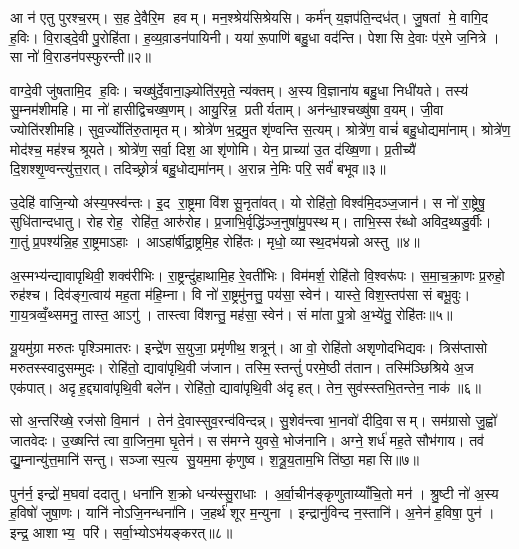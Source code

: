 आ न॑ एतु पुरश्च॒रम्। स॒ह दे॒वैरि॒म हवम्। मन॒श्श्रेय॑सिश्रेयसि। कर्म॑न् य॒ज्ञप॑ति॒न्दध॑त्। जु॒षतां मे॒ वागि॒द ह॒विः। वि॒राड्दे॒वी पु॒रोहि॑ता। ह॒व्य॒वा़डन॑पायिनी। यया॑ रू॒पाणि॑ बहु॒धा वद॑न्ति। पेशासि दे॒वाः प॑र॒मे ज॒नित्रे। सा नो॑ वि॒राडन॑पस्फुरन्ती॥२॥

वाग्दे॒वी जु॑षतामि॒द ह॒विः। चख्षु॑र्दे॒वाना॒ञ्ज्योति॑र॒मृते॒ न्य॑क्तम्। अ॒स्य वि॒ज्ञाना॑य बहु॒धा निधी॑यते। तस्य॑ सु॒म्नम॑शीमहि। मा नो॑ हासीद्विचख्ष॒णम्। आयु॒रिन्न॒ प्रतीर्यताम्। अन॑न्धा॒श्चख्षु॑षा व॒यम्। जी॒वा ज्योति॑रशीमहि। सुव॒र्ज्योति॑रु॒तामृतम्। श्रोत्रे॑ण भ॒द्रमु॒त शृ॑ण्वन्ति स॒त्यम्। श्रोत्रे॑ण॒ वाचं॑ बहु॒धोद्यमा॑नाम्। श्रोत्रे॑ण॒ मोद॑श्च॒ मह॑श्च श्रूयते। श्रोत्रे॑ण॒ सर्वा॒ दिश॒ आ शृ॑णोमि। येन॒ प्राच्या॑ उ॒त द॑ख्षि॒णा। प्र॒तीच्यै॑ दि॒शश्शृ॒ण्वन्त्यु॑त्त॒रात्। तदिच्छ्रोत्रं॑ बहु॒धोद्यमा॑नम्। अ॒रान्न ने॒मिः परि॒ सर्वं॑ बभूव॥३॥\anuvakamend[अ॒ग्रि॒यमन॑पस्फुरन्ती स॒त्य स॒प्त च॑]

उ॒देहि॑ वाजि॒न्यो अ॑स्य॒फ्स्व॑न्तः। इ॒द रा॒ष्ट्रमा वि॑श सू॒नृता॑वत्। यो रोहि॑तो॒ विश्व॑मि॒दञ्ज॒जान॑। स नो॑ रा॒ष्ट्रेषु॒ सुधि॑तान्दधातु। रोहरोह॒ रोहि॑त॒ आरु॑रोह। प्र॒जाभि॒र्वृद्धि॑ञ्ज॒नुषा॑मु॒पस्थम्। ताभि॒स्सर॑ब्धो अविद॒थ्षडु॒र्वीः। गा॒तुं प्र॒पश्य॑न्नि॒ह रा॒ष्ट्रमाऽहाः। आऽहा॑र्\mbox{}षीद्रा॒ष्ट्रमि॒ह रोहि॑तः। मृधो॒ व्यास्थ॒दभ॑यन्नो अस्तु ॥४॥

अ॒स्मभ्य॑न्द्यावापृथिवी॒ शक्व॑रीभिः। रा॒ष्ट्रन्दु॑हाथामि॒ह रे॒वती॑भिः। विम॑मर्\mbox{}श॒ रोहि॑तो वि॒श्वरू॑पः। स॒मा॒च॒क्रा॒णः प्र॒रुहो॒ रुह॑श्च। दिव॑ङ्ग॒त्वाय॑ मह॒ता म॑हि॒म्ना। वि नो॑ रा॒ष्ट्रमु॑नत्तु॒ पय॑सा॒ स्वेन॑। यास्ते॒ विश॒स्तप॑सा सं बभू॒वुः। गा॒य॒त्रव्वँ॒थ्समनु॒ तास्त॒ आऽगु॑। तास्त्वा वि॑शन्तु॒ मह॑सा॒ स्वेन॑। सं मा॑ता पु॒त्रो अ॒भ्ये॑तु॒ रोहि॑तः॥५॥

यू॒यमु॑ग्रा मरुतः पृश्ञिमातरः। इन्द्रे॑ण स॒युजा॒ प्रमृ॑णीथ॒ शत्रून्॑। आ वो॒ रोहि॑तो अशृणोदभिद्यवः। त्रिस॑प्तासो मरुतस्स्वादुसम्मुदः। रोहि॑तो॒ द्यावा॑पृथि॒वी ज॑जान। तस्मि॒स्तन्तुं॑ परमे॒ष्ठी त॑तान। तस्मि॑ञ्छिश्रिये अ॒ज एक॑पात्। अदृह॒द्द्यावा॑पृथि॒वी बले॑न। रोहि॑तो॒ द्यावा॑पृथि॒वी अ॑दृहत्। तेन॒ सुव॑स्स्तभि॒तन्तेन॒ नाक॑॥६॥

सो अ॒न्तरि॑ख्षे॒ रज॑सो वि॒मान॑। तेन॑ दे॒वास्सुव॒रन्व॑विन्दन्न्। सु॒शेव॑न्त्वा भा॒नवो॑ दीदि॒वासम्। सम॑ग्रासो जु॒ह्वो॑ जातवेदः। उ॒ख्षन्ति॑ त्वा वा॒जिन॒मा घृ॒तेन॑। सस॑मग्ने युवसे॒ भोज॑नानि। अग्ने॒ शर्ध॑ मह॒ते सौभ॑गाय। तव॑ द्यु॒म्नान्यु॑त्त॒मानि॑ सन्तु। सञ्जास्प॒त्य सु॒यम॒मा कृ॑णुष्व। श॒त्रू॒य॒ताम॒भि ति॑ष्ठा॒ महासि॥७॥\anuvakamend[अ॒स्त्वे॒तु॒ रोहि॑तो॒ नाको॒ महासि]

पुन॑र्न॒ इन्द्रो॑ म॒घवा॑ ददातु। धना॑नि श॒क्रो धन्य॑स्सु॒राधाः। अ॒र्वा॒चीन॑ङ्कृणुताय्याँचि॒तो मन॑। श्रु॒ष्टी नो॑ अ॒स्य ह॒विषो॑ जुषा॒णः। यानि॑ नोऽजि॒नन्धना॑नि। ज॒हर्थ॑ शूर म॒न्युना। इन्द्रानु॑विन्द न॒स्तानि॑। अ॒नेन॑ ह॒विषा॒ पुन॑। इन्द्र॒ आशाभ्य॒ परि॑। सर्वा॒भ्योऽभ॑यङ्करत्॥८॥

